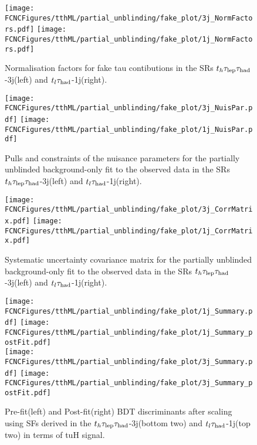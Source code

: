 \begin{figure}[H]
\centering
\texttt{[image: \\FCNCFigures/tthML/partial\_unblinding/fake\_plot/3j\_NormFactors.pdf]}
\texttt{[image: \\FCNCFigures/tthML/partial\_unblinding/fake\_plot/1j\_NormFactors.pdf]}
\\
\caption{Normalisation factors for fake tau contibutions in the SRs $t_h\tau_\text{lep}{}\tau_\text{had}$-3j(left) and $t_l\tau_\text{had}$-1j(right). }
\label{fig:tthML_partial_unblinding_NF_fake}
\end{figure}

\newpage

\begin{figure}[H]
\centering
\texttt{[image: \\FCNCFigures/tthML/partial\_unblinding/fake\_plot/3j\_NuisPar.pdf]}
\texttt{[image: \\FCNCFigures/tthML/partial\_unblinding/fake\_plot/1j\_NuisPar.pdf]}
\caption{Pulls and constraints of the nuisance parameters for the partially unblinded background-only fit to the observed data in the SRs $t_h\tau_\text{lep}{}\tau_\text{had}$-3j(left) and $t_l\tau_\text{had}$-1j(right).}
\label{fig:tthML_partial_unblinding_pull_fake}
\end{figure}

\newpage

\begin{figure}[H]
\centering
\texttt{[image: \\FCNCFigures/tthML/partial\_unblinding/fake\_plot/3j\_CorrMatrix.pdf]}
\texttt{[image: \\FCNCFigures/tthML/partial\_unblinding/fake\_plot/1j\_CorrMatrix.pdf]}
\caption{Systematic uncertainty covariance matrix for the partially unblinded background-only fit to the observed data in the SRs $t_h\tau_\text{lep}{}\tau_\text{had}$-3j(left) and $t_l\tau_\text{had}$-1j(right).}
\label{fig:tthML_partial_unblinding_corre_fake}
\end{figure}



\begin{figure}[H]
\centering
\texttt{[image: \\FCNCFigures/tthML/partial\_unblinding/fake\_plot/1j\_Summary.pdf]}
\texttt{[image: \\FCNCFigures/tthML/partial\_unblinding/fake\_plot/1j\_Summary\_postFit.pdf]}
\\
\texttt{[image: \\FCNCFigures/tthML/partial\_unblinding/fake\_plot/3j\_Summary.pdf]}
\texttt{[image: \\FCNCFigures/tthML/partial\_unblinding/fake\_plot/3j\_Summary\_postFit.pdf]}
\caption{Pre-fit(left) and Post-fit(right) BDT discriminants after scaling using SFs derived in the $t_h\tau_\text{lep}{}\tau_\text{had}$-3j(bottom two) and $t_l\tau_\text{had}$-1j(top two) in terms of tuH signal. }
\label{fig:tthML_partial_unblinding_tuH}
\end{figure}


